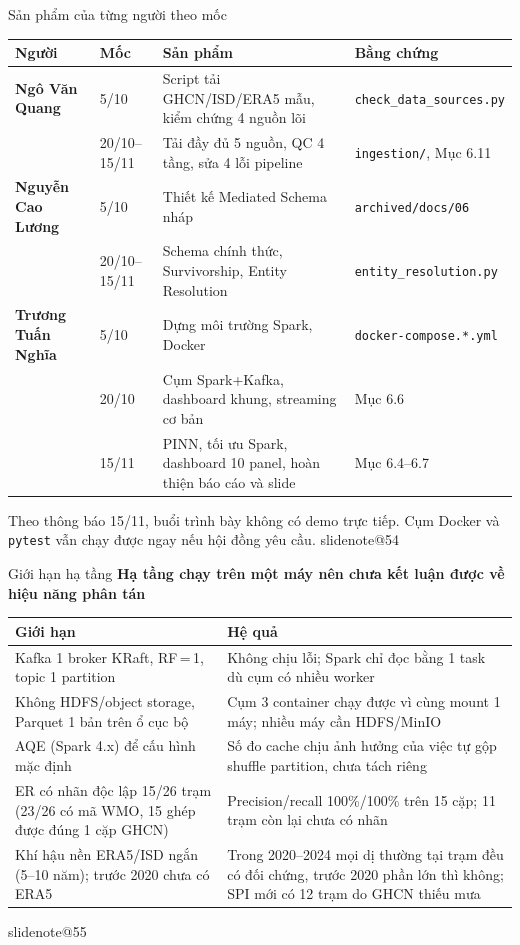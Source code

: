 \documentclass[t,aspectratio=169,12pt]{beamer}
\makeatletter
\newcommand{\slidenote}[1]{\ifcsname slidenote@#1\endcsname\note{\csname slidenote@#1\endcsname}\fi}
\newcommand{\ychinh}[1]{\vskip1mm{\bfseries #1}\par\vskip1mm}
\newcommand{\nguon}[1]{\vskip1mm{\scriptsize\color{mutedgray}#1}}
\makeatother
\begin{document}
\begin{frame}{Sản phẩm của từng người theo mốc}
  \scriptsize
  \vskip1mm
  \begin{tabular}{@{}>{\bfseries}p{2.9cm}p{1.8cm}p{6.0cm}p{3.0cm}@{}}
    \toprule
    Người & Mốc & Sản phẩm & Bằng chứng \\
    \midrule
    Ngô Văn Quang & 5/10 & Script tải GHCN/ISD/ERA5 mẫu, kiểm chứng 4 nguồn lõi & \texttt{check\_data\_sources.py} \\
    & 20/10--15/11 & Tải đầy đủ 5 nguồn, QC 4 tầng, sửa 4 lỗi pipeline & \texttt{ingestion/}, Mục 6.11 \\ \addlinespace[2pt]
    Nguyễn Cao Lương & 5/10 & Thiết kế Mediated Schema nháp & \texttt{archived/docs/06} \\
    & 20/10--15/11 & Schema chính thức, Survivorship, Entity Resolution & \texttt{entity\_resolution.py} \\ \addlinespace[2pt]
    Trương Tuấn Nghĩa & 5/10 & Dựng môi trường Spark, Docker & \texttt{docker-compose.*.yml} \\
    & 20/10 & Cụm Spark+Kafka, dashboard khung, streaming cơ bản & Mục 6.6 \\
    & 15/11 & PINN, tối ưu Spark, dashboard 10 panel, hoàn thiện báo cáo và slide & Mục 6.4--6.7 \\
    \bottomrule
  \end{tabular}
  \nguon{Theo thông báo 15/11, buổi trình bày không có demo trực tiếp. Cụm Docker và \texttt{pytest} vẫn chạy được ngay nếu hội đồng yêu cầu.}
  \slidenote{54}
\end{frame}
\begin{frame}{Giới hạn hạ tầng}
  \ychinh{Hạ tầng chạy trên một máy nên chưa kết luận được về hiệu năng phân tán}
  \scriptsize
  \renewcommand{\arraystretch}{0.95}
  \begin{tabular}{@{}p{5.0cm}p{8.2cm}@{}}
    \toprule
    Giới hạn & Hệ quả \\
    \midrule
    Kafka 1 broker KRaft, RF\,=\,1, topic 1 partition & Không chịu lỗi; Spark chỉ đọc bằng 1 task dù cụm có nhiều worker \\
    Không HDFS/object storage, Parquet 1 bản trên ổ cục bộ & Cụm 3 container chạy được vì cùng mount 1 máy; nhiều máy cần HDFS/MinIO \\
    AQE (Spark 4.x) để cấu hình mặc định & Số đo cache chịu ảnh hưởng của việc tự gộp shuffle partition, chưa tách riêng \\
    ER có nhãn độc lập 15/26 trạm (23/26 có mã WMO, 15 ghép được đúng 1 cặp GHCN) & Precision/recall 100\%/100\% trên 15 cặp; 11 trạm còn lại chưa có nhãn \\
    Khí hậu nền ERA5/ISD ngắn (5--10 năm); trước 2020 chưa có ERA5 & Trong 2020--2024 mọi dị thường tại trạm đều có đối chứng, trước 2020 phần lớn thì không; SPI mới có 12 trạm do GHCN thiếu mưa \\
    \bottomrule
  \end{tabular}
  \slidenote{55}
\end{frame}
\end{document}
